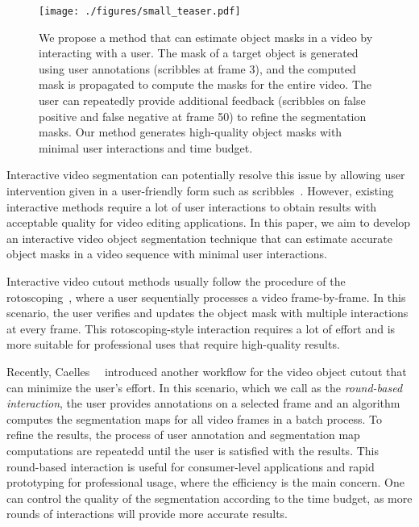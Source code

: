 \documentclass[10pt,twocolumn,letterpaper]{article}
\begin{document}
\begin{figure}
\centering
\texttt{[image: ./figures/small\_teaser.pdf]}
\caption{We propose a method that can estimate object masks in a video by interacting with a user. 
The mask of a target object is generated using user annotations (\eg scribbles at frame 3), and the computed mask is propagated to compute the masks for the entire video. 
The user can repeatedly provide additional feedback (\eg scribbles on false positive and false negative at frame 50) to refine the segmentation masks.
Our method generates high-quality object masks with minimal user interactions and time budget.}
\label{Fig:teaser}
\end{figure}


Interactive video segmentation can potentially resolve this issue by allowing user intervention given in a user-friendly form such as scribbles~\cite{wang2005interactive, price2009livecut, bai2009video}.
However, existing interactive methods require a lot of user interactions to obtain results with acceptable quality for video editing applications.
In this paper, we aim to develop an interactive video object segmentation technique that can estimate accurate object masks in a video sequence with minimal user interactions.




Interactive video cutout methods usually follow the procedure of the rotoscoping~\cite{bratt2012rotoscoping, li2016roto++}, where a user sequentially processes a video frame-by-frame. 
In this scenario, the user verifies and updates the object mask with multiple interactions at every frame. 
This rotoscoping-style interaction requires a lot of effort and is more suitable for professional uses that require high-quality results. 


Recently, Caelles~\etal~\cite{caelles20182018} introduced another workflow for the video object cutout that can minimize the user's effort. In this scenario, which we call as the \textit{round-based interaction}, the user provides annotations on a selected frame and an algorithm computes the segmentation maps for all video frames in a batch process.
To refine the results, the process of user annotation and segmentation map computations are repeatedd until the user is satisfied with the results. 
This round-based interaction is useful for consumer-level applications and rapid prototyping for professional usage, where the efficiency is the main concern. 
One can control the quality of the segmentation according to the time budget, as more rounds of interactions will provide more accurate results. 
\end{document}
